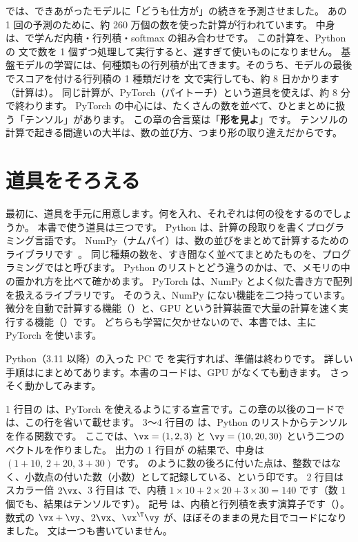 では、できあがったモデルに「どうも仕方が」の続きを予測させました。
あの 1 回の予測のために、約 260 万個の数を使った計算が行われています。
中身は、で学んだ内積・行列積・softmax の組み合わせです。
この計算を、Python の  文で数を 1 個ずつ処理して実行すると、遅すぎて使いものになりません。
基盤モデルの学習には、何種類もの行列積が出てきます。そのうち、モデルの最後でスコアを付ける行列積の 1 種類だけを  文で実行しても、約 8 日かかります（計算は）。
同じ計算が、PyTorch（パイトーチ）という道具を使えば、約 8 分で終わります。
PyTorch の中心には、たくさんの数を並べて、ひとまとめに扱う「テンソル」があります。
この章の合言葉は「\textbf{形を見よ}」です。
テンソルの計算で起きる間違いの大半は、数の並び方、つまり形の取り違えだからです。

\section{道具をそろえる}\label{sec:pt-tools}

最初に、道具を手元に用意します。何を入れ、それぞれは何の役をするのでしょうか。
本書で使う道具は三つです。
Python は、計算の段取りを書くプログラミング言語です。
NumPy（ナムパイ）は、数の並びをまとめて計算するためのライブラリです~\cite{harris2020numpy}。
同じ種類の数を、すき間なく並べてまとめたものを、プログラミングではと呼びます。
Python のリストとどう違うのかは、で、メモリの中の置かれ方を比べて確かめます。
PyTorch\cite{paszke2019pytorch} は、NumPy とよく似た書き方で配列を扱えるライブラリです。
そのうえ、NumPy にない機能を二つ持っています。
微分を自動で計算する機能（）と、GPU という計算装置で大量の計算を速く実行する機能（）です。
どちらも学習に欠かせないので、本書では、主に PyTorch を使います。

Python（3.11 以降）の入った PC で  を実行すれば、準備は終わりです。
詳しい手順はにまとめてあります。本書のコードは、GPU がなくても動きます。
さっそく動かしてみます。



1 行目の  は、PyTorch を使えるようにする宣言です。この章の以後のコードでは、この行を省いて載せます。
3〜4 行目の  は、Python のリストからテンソルを作る関数です。
ここでは、$\vx=(1,2,3)$ と $\vy=(10,20,30)$ という二つのベクトルを作りました。
出力の 1 行目が  の結果で、中身は $(1+10,\,2+20,\,3+30)$ です。
 のように数の後ろに付いた点は、整数ではなく、小数点の付いた数（小数）として記録している、という印です。
2 行目はスカラー倍 $2\vx$、3 行目は  で、内積 $1\times 10+2\times 20+3\times 30=140$ です（数 1 個でも、結果はテンソルです）。
記号  は、内積と行列積を表す演算子です（）。
数式の $\vx+\vy$、$2\vx$、$\vx^\T\vy$ が、ほぼそのままの見た目でコードになりました。 文は一つも書いていません。

